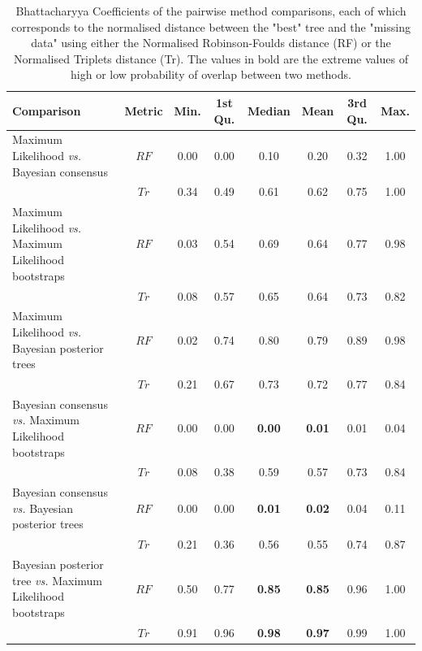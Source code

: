 \documentclass[12pt,letterpaper]{article}
\begin{document}
\begin{landscape}
\begin{table}[ht]
\caption{Bhattacharyya Coefficients of the pairwise method comparisons, each of which corresponds to the normalised distance between the "best" tree and the "missing data" using either the Normalised Robinson-Foulds distance (RF) or the Normalised Triplets distance (Tr). The values in bold are the extreme values of high or low probability of overlap between two methods.}
\centering
\begin{tabular}{lccccccc}
  \hline
 Comparison &  Metric & Min. & 1st Qu. & Median & Mean & 3rd Qu. & Max. \\ 
  \hline
    Maximum Likelihood \textit{vs.} Bayesian consensus                 & $RF$ & 0.00 & 0.00 & 0.10 & 0.20 & 0.32 & 1.00 \\ 
                                                                       & $Tr$ & 0.34 & 0.49 & 0.61 & 0.62 & 0.75 & 1.00 \\ 
    Maximum Likelihood \textit{vs.} Maximum Likelihood bootstraps      & $RF$ & 0.03 & 0.54 & 0.69 & 0.64 & 0.77 & 0.98 \\ 
                                                                       & $Tr$ & 0.08 & 0.57 & 0.65 & 0.64 & 0.73 & 0.82 \\ 
    Maximum Likelihood \textit{vs.} Bayesian posterior trees           & $RF$ & 0.02 & 0.74 & 0.80 & 0.79 & 0.89 & 0.98 \\ 
                                                                       & $Tr$ & 0.21 & 0.67 & 0.73 & 0.72 & 0.77 & 0.84 \\ 
    Bayesian consensus \textit{vs.} Maximum Likelihood bootstraps      & $RF$ & 0.00 & 0.00 & \textbf{0.00} & \textbf{0.01} & 0.01 & 0.04 \\ 
                                                                       & $Tr$ & 0.08 & 0.38 & 0.59 & 0.57 & 0.73 & 0.84 \\ 
    Bayesian consensus \textit{vs.} Bayesian posterior trees           & $RF$ & 0.00 & 0.00 & \textbf{0.01} & \textbf{0.02} & 0.04 & 0.11 \\ 
                                                                       & $Tr$ & 0.21 & 0.36 & 0.56 & 0.55 & 0.74 & 0.87 \\ 
    Bayesian posterior tree \textit{vs.} Maximum Likelihood bootstraps & $RF$ & 0.50 & 0.77 & \textbf{0.85} & \textbf{0.85} & 0.96 & 1.00 \\ 
                                                                       & $Tr$ & 0.91 & 0.96 & \textbf{0.98} & \textbf{0.97} & 0.99 & 1.00 \\ 
   \hline
\end{tabular}
\label{Tab_Results-Difference_methods}
\end{table}
\end{landscape}
\end{document}
